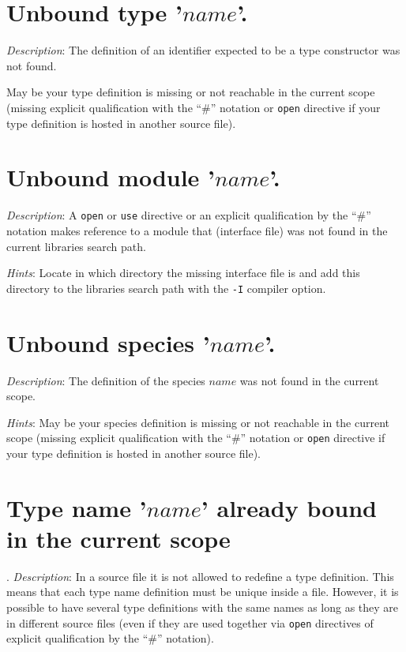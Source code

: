 \section*{Unbound type '$name$'.}
{\em Description}: The definition of an identifier expected to be a
type constructor was not found.

May be your type definition is missing or not reachable in the current
scope (missing explicit qualification with the ``\#'' notation or
{\tt open} directive if your type definition is hosted in another
source file).



\section*{Unbound module '$name$'.}
{\em Description}: A {\tt open} or {\tt use} directive or an explicit
qualification by the ``\#'' notation makes reference to a module that
(interface file) was not found in the current libraries search path.

{\em Hints}: Locate in which directory the missing interface file is
and add this directory to the libraries search path with the {\tt -I}
compiler option.



\section*{Unbound species '$name$'.}
{\em Description}: The definition of the species $name$ was not found
in the current scope.

{\em Hints}: May be your species definition is missing or not
reachable in the current scope (missing explicit qualification with
the ``\#'' notation or {\tt open} directive if your type definition is
hosted in another source file).




\section*{Type name '$name$' already bound in the current scope}.
{\em Description}: In a source file it is not allowed to redefine a
type definition. This means that each type name definition must be
unique inside a file. However, it is possible to have several type
definitions with the same names as long as they are in different
source files (even if they are used together via {\tt open} directives
of explicit qualification by the ``\#'' notation).

